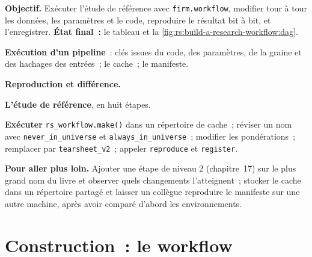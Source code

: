 \begin{tutorial}
\textbf{Objectif.} Exécuter l'étude de référence avec \texttt{firm.workflow}, modifier tour à tour les données, les paramètres et le code, reproduire le résultat bit à bit, et
l'enregistrer. \textbf{État final~:} le tableau et la \cref{fig:rs:build-a-research-workflow:dag}.
\begin{tutsteps}
\item \textbf{Exécution d'un pipeline}~: clés issues du code, des paramètres, de la graine et des hachages des entrées~; le cache~; le manifeste.
\label{lst:rs:build-a-research-workflow:run}
\item \textbf{Reproduction et différence.}
\label{lst:rs:build-a-research-workflow:repro}
\item \textbf{L'étude de référence}, en huit étapes.
\label{lst:rs:build-a-research-workflow:make}
\item \textbf{Exécuter} \texttt{rs\_workflow.make()} dans un répertoire de cache~; réviser un nom avec \texttt{never\_in\_universe} et \texttt{always\_in\_universe}~; modifier les
pondérations~; remplacer par \texttt{tearsheet\_v2}~; appeler \texttt{reproduce} et \texttt{register}.
\end{tutsteps}
\textbf{Pour aller plus loin.} Ajouter une étape de niveau 2 (chapitre~17) sur le plus grand nom du livre et observer quels changements l'atteignent~; stocker le cache dans un répertoire partagé et
laisser un collègue reproduire le manifeste sur une autre machine, après avoir comparé d'abord les environnements.
\end{tutorial}

\section{Construction~: le workflow}\label{bld:rs:build-a-research-workflow:workflow}

